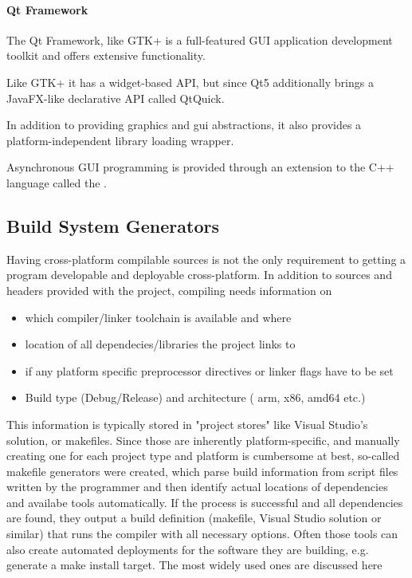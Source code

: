 \paragraph{Qt Framework}
The Qt Framework, like GTK+ is a full-featured GUI application development toolkit and offers extensive functionality.

Like GTK+ it has a widget-based API, but since Qt5 additionally brings a JavaFX-like declarative API called QtQuick.

In addition to providing graphics and \gls{gui} abstractions, it also provides a platform-independent library loading wrapper.

Asynchronous GUI programming is provided through an extension to the C++ language called the .

\subsection{Build System Generators}
\label{sec:resMakefileGen}
Having cross-platform compilable sources is not the only requirement to getting a program developable and deployable cross-platform.
In addition to sources and headers provided with the project, compiling needs information on 
\begin{itemize}
	\item which compiler/linker toolchain is available and where
	\item location of all dependecies/libraries the project links to
	\item if any platform specific preprocessor directives or linker flags have to be set
	\item Build type (Debug/Release) and architecture ( arm, x86, amd64 etc.)
\end{itemize}

This information is typically stored in "project stores" like Visual Studio's solution, or makefiles. Since those are inherently platform-specific, and manually creating one for each project type and platform is cumbersome at best, so-called makefile generators were created, which parse build information from script files written by the programmer and then identify actual locations of dependencies and availabe tools automatically. If the process is successful and all dependencies are found, they output a build definition (makefile, Visual Studio solution or similar) that runs the compiler with all necessary options. Often those tools can also create automated deployments for the software they are building, e.g. generate a make install target. The most widely used ones are discussed here

